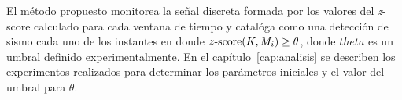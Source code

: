El método propuesto monitorea la señal discreta formada por los valores del {\em z}-score calculado para cada ventana de tiempo y catalóga como una detección de sismo cada uno de los instantes en donde $z\textnormal{-}\mathrm{score}(K, M_i)\ge\theta$, donde $theta$ es un umbral definido experimentalmente.
%
En el capítulo~\ref{cap:analisis} se describen los experimentos realizados para determinar los parámetros iniciales y el valor del umbral para $\theta$. 
	
%
%
%
%
%

